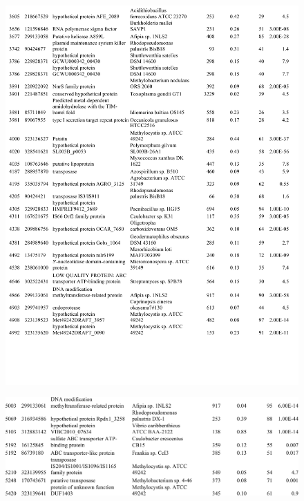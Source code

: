 \begin{figure}[H]
\centering
    \includegraphics[width=1.0\textwidth]{./tex/chapter1/figures/supplemental/TableS1f.pdf}
\end{figure}
\begin{figure}[H]
\centering
    \includegraphics[width=1.0\textwidth]{./tex/chapter1/figures/supplemental/TableS1g.pdf}
\end{figure}


